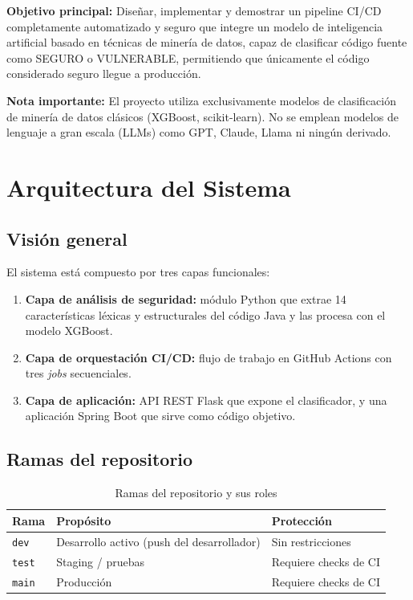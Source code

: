\documentclass[12pt,a4paper]{article}
\begin{document}
\textbf{Objetivo principal:} Diseñar, implementar y demostrar un pipeline CI/CD completamente automatizado y seguro que integre un modelo de inteligencia artificial basado en técnicas de minería de datos, capaz de clasificar código fuente como SEGURO o VULNERABLE, permitiendo que únicamente el código considerado seguro llegue a producción.

\textbf{Nota importante:} El proyecto utiliza exclusivamente modelos de clasificación de minería de datos clásicos (XGBoost, scikit-learn). No se emplean modelos de lenguaje a gran escala (LLMs) como GPT, Claude, Llama ni ningún derivado.

\section{Arquitectura del Sistema}

\subsection{Visión general}

El sistema está compuesto por tres capas funcionales:

\begin{enumerate}
  \item \textbf{Capa de análisis de seguridad:} módulo Python que extrae 14 características léxicas y estructurales del código Java y las procesa con el modelo XGBoost.
  \item \textbf{Capa de orquestación CI/CD:} flujo de trabajo en GitHub Actions con tres \textit{jobs} secuenciales.
  \item \textbf{Capa de aplicación:} API REST Flask que expone el clasificador, y una aplicación Spring Boot que sirve como código objetivo.
\end{enumerate}

\subsection{Ramas del repositorio}

\begin{table}[H]
\centering
\begin{tabular}{@{}lll@{}}
\toprule
\textbf{Rama} & \textbf{Propósito} & \textbf{Protección} \\
\midrule
\texttt{dev}  & Desarrollo activo (push del desarrollador) & Sin restricciones \\
\texttt{test} & Staging / pruebas                          & Requiere checks de CI \\
\texttt{main} & Producción                                 & Requiere checks de CI \\
\bottomrule
\end{tabular}
\caption{Ramas del repositorio y sus roles}
\end{table}
\end{document}
